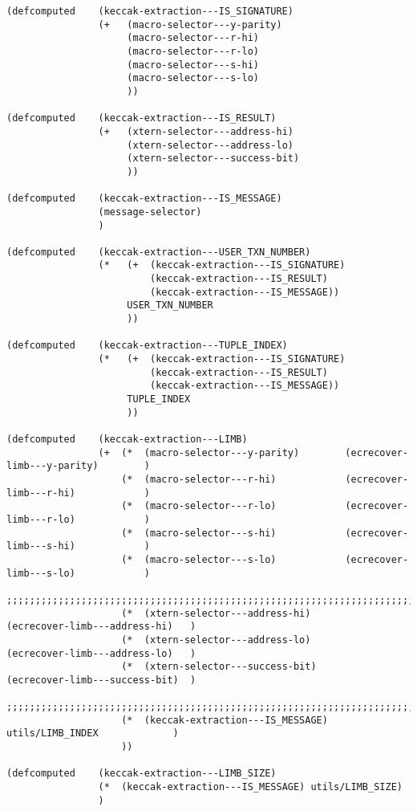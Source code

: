 \documentclass[varwidth=\maxdimen,margin=0.5cm,multi={verbatim}]{standalone}
\begin{document}
\begin{verbatim}
(defcomputed    (keccak-extraction---IS_SIGNATURE)
                (+   (macro-selector---y-parity)
                     (macro-selector---r-hi)
                     (macro-selector---r-lo)
                     (macro-selector---s-hi)
                     (macro-selector---s-lo)
                     ))

(defcomputed    (keccak-extraction---IS_RESULT)
                (+   (xtern-selector---address-hi)
                     (xtern-selector---address-lo)
                     (xtern-selector---success-bit)
                     ))

(defcomputed    (keccak-extraction---IS_MESSAGE)
                (message-selector)
                )

(defcomputed    (keccak-extraction---USER_TXN_NUMBER)
                (*   (+  (keccak-extraction---IS_SIGNATURE)
                         (keccak-extraction---IS_RESULT)
                         (keccak-extraction---IS_MESSAGE))
                     USER_TXN_NUMBER
                     ))

(defcomputed    (keccak-extraction---TUPLE_INDEX)
                (*   (+  (keccak-extraction---IS_SIGNATURE)
                         (keccak-extraction---IS_RESULT)
                         (keccak-extraction---IS_MESSAGE))
                     TUPLE_INDEX
                     ))

(defcomputed    (keccak-extraction---LIMB)
                (+  (*  (macro-selector---y-parity)        (ecrecover-limb---y-parity)        )
                    (*  (macro-selector---r-hi)            (ecrecover-limb---r-hi)            )
                    (*  (macro-selector---r-lo)            (ecrecover-limb---r-lo)            )
                    (*  (macro-selector---s-hi)            (ecrecover-limb---s-hi)            )
                    (*  (macro-selector---s-lo)            (ecrecover-limb---s-lo)            )
                    ;;;;;;;;;;;;;;;;;;;;;;;;;;;;;;;;;;;;;;;;;;;;;;;;;;;;;;;;;;;;;;;;;;;;;;;;;;;
                    (*  (xtern-selector---address-hi)         (ecrecover-limb---address-hi)   )
                    (*  (xtern-selector---address-lo)         (ecrecover-limb---address-lo)   )
                    (*  (xtern-selector---success-bit)        (ecrecover-limb---success-bit)  )
                    ;;;;;;;;;;;;;;;;;;;;;;;;;;;;;;;;;;;;;;;;;;;;;;;;;;;;;;;;;;;;;;;;;;;;;;;;;;;
                    (*  (keccak-extraction---IS_MESSAGE)         utils/LIMB_INDEX             )
                    ))

(defcomputed    (keccak-extraction---LIMB_SIZE)
                (*  (keccak-extraction---IS_MESSAGE) utils/LIMB_SIZE)
                )


\end{verbatim}
\end{document}
